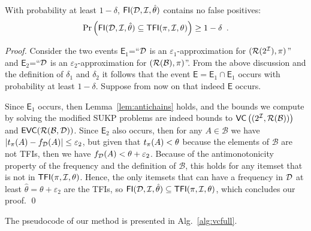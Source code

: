 \begin{theorem}\label{lem:vcfull}
With probability at least $1-\delta$, %
$\mathsf{FI}({\cal D},{\cal I},\hat\theta)$ contains no false positives:
\[
\Pr\left(\mathsf{FI}({\cal D},{\cal I},\hat\theta)\subseteq\mathsf{TFI}(\pi,{\cal I},\theta)\right)\ge 1-\delta\enspace.\]
\end{theorem}
\begin{proof}
  Consider the two events $\mathsf{E}_1$=``${\cal D}$ is an
  $\varepsilon_1$-approximation for $(\mathcal{R}(2^{\cal I}),\pi)$'' and
  $\mathsf{E}_2$=``${\cal D}$ is an
  $\varepsilon_2$-approximation for $(\mathcal{R}(\mathcal{B}),\pi)$''. From
  the above discussion and the definition of $\delta_1$ and $\delta_2$ it
  follows that the event $\mathsf{E}=\mathsf{E}_1\cap\mathsf{E}_1$ occurs with
  probability at least $1-\delta$. Suppose from now on that indeed $\mathsf{E}$
  occurs.

  Since $\mathsf{E}_1$ occurs, then Lemma~\ref{lem:antichains}
  holds, and the bounds we compute by solving the modified SUKP problems are
  indeed bounds to $\mathsf{VC}\left((2^{\cal I},\mathcal{R}(\mathcal{B}))\right)$ and
  $\mathsf{EVC}(\mathcal{R}(\mathcal{B},{\cal D}))$. %
  Since $\mathsf{E}_2$ also occurs, then for any $A\in\mathcal{B}$ we
  have $|t_\pi(A)-f_{\cal D}(A)|\le\varepsilon_2$, but given that $t_\pi(A)<\theta$
  because the elements of $\mathcal{B}$ are not TFIs, then we have
  $f_{\cal D}(A)<\theta+\varepsilon_2$. Because of the antimonotonicity property
  of the frequency and the definition of $\mathcal{B}$, this holds for any
  itemset that is not in $\mathsf{TFI}(\pi,{\cal I},\theta)$. Hence, the only itemsets that can have a
  frequency in ${\cal D}$ at least $\hat{\theta}=\theta+\varepsilon_2$ are the TFIs, so
  $\mathsf{FI}({\cal D},{\cal I},\hat{\theta})\subseteq\mathsf{TFI}(\pi,{\cal I},\theta)$, which concludes
  our proof.
  \qed
\end{proof}

The pseudocode of our method is presented in Alg.~\ref{alg:vcfull}.

